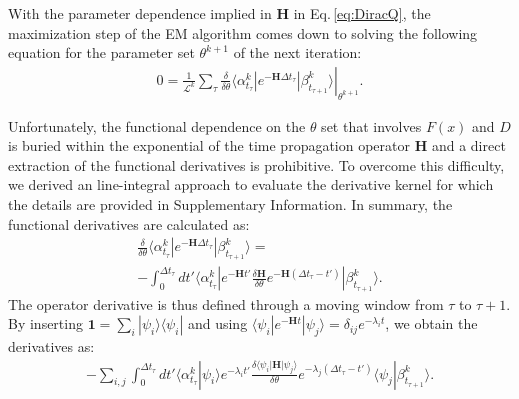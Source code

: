 \documentclass[journal=jpcbfk,manuscript=article,layout=twocolumn,articletitle=true]{achemso}
\begin{document}
With the parameter dependence implied in $\bm H$ in Eq.\,\ref{eq:DiracQ}, the maximization step of the EM algorithm comes down to solving the following equation for the parameter set $\theta^{k+1}$ of the next iteration: 
\begin{align}
\label{eq:QkD}
 0 = \frac{1}{\mathcal{L}^k} \left . \sum_{\tau} \frac{\delta}{\delta \theta} \langle \alpha^k_{t_\tau} | e^{-\bm{H} \Delta t_{\tau} } | \beta^k_{t_{\tau+1}} \rangle \right |_{\theta^{k+1}}.
\end{align}

Unfortunately, the functional dependence on the $\theta$ set that involves $F(x)$ and $D$ is buried within the exponential of the time propagation operator $\bm H$ and a direct extraction of the functional derivatives is prohibitive. To overcome this difficulty, we derived an line-integral approach to evaluate the derivative kernel\cite{Wilcox:1967vr} for which the details are provided in Supplementary Information. In summary, the functional derivatives are calculated as:
\begin{multline}
\frac{\delta}{\delta \theta} \langle \alpha^k_{t_\tau} | e^{-\bm{H} \Delta t_{\tau} } | \beta^k_{t_{\tau+1}}\rangle = \\ -\int^{\Delta t_{\tau}}_{0} dt'  \langle \alpha^k_{t_\tau} | e^{-\bm{H} t'} \frac{\delta \bm{H}}{\delta \theta} e^{-\bm{H} (\Delta t_{\tau} -t')}| \beta^k_{t_{\tau+1}} \rangle.
\end{multline}
The operator derivative is thus defined through a moving window from $\tau$ to $\tau+1$. By inserting $\bm{1} = \sum_i | \psi_i \rangle \langle \psi_i |$ and using $\langle \psi_i | e^{-\bm{H}t} | \psi_j \rangle = \delta_{ij} e^{-\lambda_i t}$, we obtain the derivatives as:
\begin{align}
\label{eq:QkDPart}
-\sum_{i,j} \int^{\Delta t_{\tau}}_{0} dt'  \langle \alpha^k_{t_\tau} | \psi_i \rangle e^{-\lambda_i t'} \frac{\delta \langle \psi_i | \bm{H} | \psi_j \rangle}{\delta \theta}  e^{-\lambda_j  (\Delta t_{\tau} -t')} \langle \psi_j | \beta^k_{t_{\tau+1}} \rangle.
\end{align}
\end{document}
